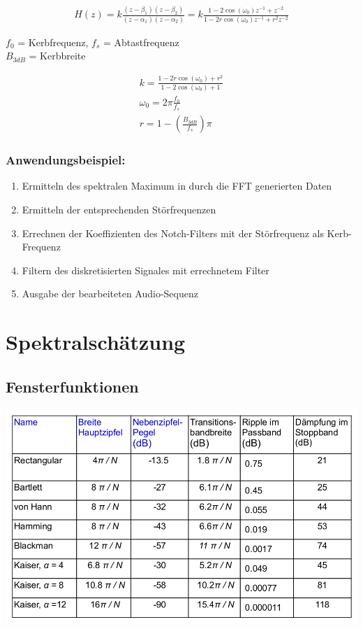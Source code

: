 \documentclass[10pt,a4paper]{article}
\begin{document}
  \begin{mdframed}[style=exercise]
    \begin{align}
  H(z) = k \frac{(z-\beta_1)(z-\beta_2)}{(z-\alpha_1)(z-\alpha_2)} 
       = k \frac{1-2\cos(\omega_0)z^{-1}+z^{-2}}{1-2r\cos(\omega_0)z^{-1}+r^2 z^{-2}}
    \end{align}
  \end{mdframed}
$f_0$ = Kerbfrequenz, $f_s$ = Abtastfrequenz \\
$B_{3dB}$ = Kerbbreite 
  \begin{mdframed}[style=exercise]
    \begin{align}
      k = \frac{1-2r\cos(\omega_0)+r^2}{1-2\cos(\omega_0)+1}\\
      \omega_0 = 2\pi \frac{f_0}{f_s}\\
      r=1-(\frac{B_{3dB}}{f_s})\pi
    \end{align}
  \end{mdframed}

\subsubsection{Anwendungsbeispiel:}
\begin{enumerate}
  \item Ermitteln des spektralen Maximum in durch die FFT generierten Daten
  \item Ermitteln der entsprechenden Störfrequenzen
  \item Errechnen der Koeffizienten des Notch-Filters mit der Störfrequenz als Kerb-Frequenz
  \item Filtern des diskretisierten Signales mit errechnetem Filter
  \item Ausgabe der bearbeiteten Audio-Sequenz
\end{enumerate}

\section{Spektralschätzung}
\subsection{Fensterfunktionen}

\begin{center}
  \includegraphics[width=.5\textwidth]{./img/Fensterfunktionen_Vergleich.png}
\end{center}
\end{document}
